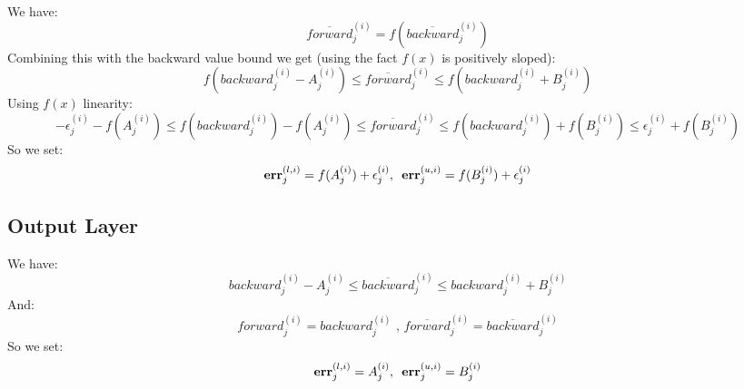 \documentclass[10pt, conference, twocolumn, compsocconf]{IEEEtran}
\theoremstyle{remark}
\begin{document}
\begin{appendices}
\noindent
We have:
\[ \overline{forward}_j^{(i)} = f(\overline{backward}_j^{(i)}) \]
Combining this with the backward value bound we get (using the fact $f(x)$ is positively sloped):
\[ f(backward^{(i)}_{j} - A^{(i)}_{j}) \leq \overline{forward}_j^{(i)} \leq f(backward^{(i)}_{j} + B^{(i)}_{j}) \]
Using $f(x)$ linearity:
\[ -\epsilon_j^{(i)} - f(A^{(i)}_{j}) \leq f(backward^{(i)}_{j}) - f(A^{(i)}_{j}) \leq \overline{forward}_j^{(i)} \leq f(backward^{(i)}_{j}) + f(B^{(i)}_{j}) \leq \epsilon_j^{(i)} + f(B^{(i)}_{j}) \]
So we set:
\[{\bf err}_j^{(l,i)} = f(A^{(i)}_{j}) + \epsilon_j^{(i)} \mbox{,\ \ } {\bf err}_j^{(u,i)} = f(B_j^{(i)}) + \epsilon_j^{(i)} \]


\subsection{Output Layer}
\noindent
We have:
\[ backward^{(i)}_{j} - A^{(i)}_{j} \leq \overline{backward}_j^{(i)} \leq backward^{(i)}_{j} + B^{(i)}_{j} \]
And:
\[ forward^{(i)}_{j} = backward^{(i)}_{j} \mbox{ , } \overline{forward}^{(i)}_{j} = \overline{backward}^{(i)}_{j} \]
So we set:
\[{\bf err}_j^{(l,i)} = A_j^{(i)} \mbox{,\ \ } {\bf err}_j^{(u,i)} = B_j^{(i)} \]

\end{appendices}
\end{document}
